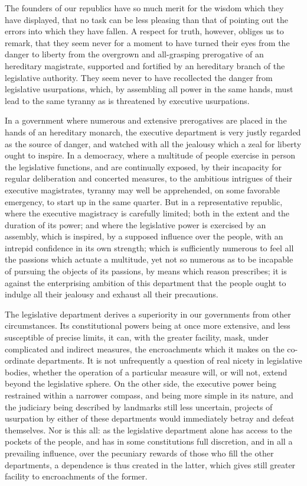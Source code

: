 The founders of our republics have so much merit for the wisdom which they have displayed, that no task can be less pleasing than that of pointing out the errors into which they have fallen. 
A respect for truth, however, obliges us to remark, that they seem never for a moment to have turned their eyes from the danger to liberty from the overgrown and all-grasping prerogative of an hereditary magistrate, supported and fortified by an hereditary branch of the legislative authority. 
They seem never to have recollected the danger from legislative usurpations, which, by assembling all power in the same hands, must lead to the same tyranny as is threatened by executive usurpations.

In a government where numerous and extensive prerogatives are placed in the hands of an hereditary monarch, the executive department is very justly regarded as the source of danger, and watched with all the jealousy which a zeal for liberty ought to inspire. 
In a democracy, where a multitude of people exercise in person the legislative functions, and are continually exposed, by their incapacity for regular deliberation and concerted measures, to the ambitious intrigues of their executive magistrates, tyranny may well be apprehended, on some favorable emergency, to start up in the same quarter. 
But in a representative republic, where the executive magistracy is carefully limited; both in the extent and the duration of its power; and where the legislative power is exercised by an assembly, which is inspired, by a supposed influence over the people, with an intrepid confidence in its own strength; which is sufficiently numerous to feel all the passions which actuate a multitude, yet not so numerous as to be incapable of pursuing the objects of its passions, by means which reason prescribes; it is against the enterprising ambition of this department that the people ought to indulge all their jealousy and exhaust all their precautions.

The legislative department derives a superiority in our governments from other circumstances. 
Its constitutional powers being at once more extensive, and less susceptible of precise limits, it can, with the greater facility, mask, under complicated and indirect measures, the encroachments which it makes on the co-ordinate departments. 
It is not unfrequently a question of real nicety in legislative bodies, whether the operation of a particular measure will, or will not, extend beyond the legislative sphere. 
On the other side, the executive power being restrained within a narrower compass, and being more simple in its nature, and the judiciary being described by landmarks still less uncertain, projects of usurpation by either of these departments would immediately betray and defeat themselves. 
Nor is this all: as the legislative department alone has access to the pockets of the people, and has in some constitutions full discretion, and in all a prevailing influence, over the pecuniary rewards of those who fill the other departments, a dependence is thus created in the latter, which gives still greater facility to encroachments of the former.

